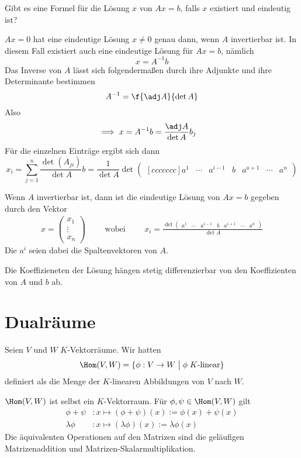 \documentclass[a4paper, 10pt]{scrbook}
\begin{document}
Gibt es eine Formel für die Lösung $x$ von $Ax=b$, falls $x$ existiert und eindeutig ist?

$Ax=0$ hat eine eindeutige Lösung $x\neq 0$ genau dann, wenn $A$ invertierbar ist.
In diesem Fall existiert auch eine eindeutige Lösung für $Ax=b$, nämlich
\[
	x=A^{-1}b
\]
Das Inverse von $A$ lässt sich folgendermaßen durch ihre Adjunkte und ihre Determinante bestimmen
\[
	A^{-1} = \f{\adj A}{\det A}
\]
Also
\begin{align*}
\implies x=A^{-1}b&=\frac{\adj A}{\det A}b_j
\end{align*}
Für die einzelnen Einträge ergibt sich dann
\[
x_i
=\sum_{j=1}^n\frac{\det(A_{ji})}{\det A}b
=\frac 1{\det A}\det\begin{pmatrix}[ccccccc]a^1&\cdots&a^{i-1}&b&a^{a+1}&\cdots&a^n\end{pmatrix}
\]
\begin{kor} \label{kor: 8.15}
Wenn $A$ invertierbar ist, dann ist die eindeutige Lösung von $Ax=b$ gegeben durch den Vektor
\begin{align*}
x=\begin{pmatrix}x_1\\ \vdots \\ x_n\end{pmatrix} \qquad \text{ wobei }\qquad
x_i=\frac{
\det\begin{pmatrix}
a^1 & \cdots & a^{i-1} & b & a^{i+1} & \cdots & a^n
\end{pmatrix}
}{\det A}
\end{align*}
Die $a^i$ seien dabei die Spaltenvektoren von $A$.\end{kor}
\begin{note}[Konsequenz]
Die Koeffizieneten der Lösung hängen stetig differenzierbar von den Koeffizienten von $A$ und $b$ ab. 
\end{note}




\chapter{Dualräume}

Seien $V$ und $W$ $K$-Vektorräume. 
Wir hatten
\[
	\Hom(V,W)=\{\phi:V\to W \;\big|\; \phi\; K\text{-linear}\}
\]
definiert als die Menge der $K$-linearen Abbildungen von $V$ nach $W$.

$\Hom(V,W)$ ist selbst ein $K$-Vektorraum. Für $\phi,\psi\in \Hom(V,W)$ gilt
\begin{align*}
\phi+\psi&:x\mapsto (\phi+\psi)(x):=\phi(x)+\psi(x)\\
\lambda\phi&:x\mapsto (\lambda\phi)(x):=\lambda\phi(x)
\end{align*}
Die äquivalenten Operationen auf den Matrizen sind die geläufigen Matrizenaddition und Matrizen-Skalarmultiplikation.
\end{document}
